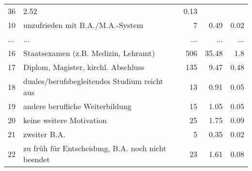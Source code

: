 \begin{longtable}{lXrrr}
          \num{36} &
          \num[round-mode=places,round-precision=2]{2,52} &
          \num[round-mode=places,round-precision=2]{0,13} \\
        10 & \multicolumn{1}{X}{unzufrieden mit B.A./M.A.-System} & %
          \num{7} &
          \num[round-mode=places,round-precision=2]{0,49} &
          \num[round-mode=places,round-precision=2]{0,02} \\
       ... & ... & ... & ... & ... \\
        16 & \multicolumn{1}{X}{Staatsexamen (z.B. Medizin, Lehramt)} & %
          \num{506} &
          \num[round-mode=places,round-precision=2]{35,48} &
          \num[round-mode=places,round-precision=2]{1,8} \\

        17 & \multicolumn{1}{X}{Diplom, Magister, kirchl. Abschluss} & %
          \num{135} &
          \num[round-mode=places,round-precision=2]{9,47} &
          \num[round-mode=places,round-precision=2]{0,48} \\

        18 & \multicolumn{1}{X}{duales/berufsbegleitendes Studium reicht aus} & %
          \num{13} &
          \num[round-mode=places,round-precision=2]{0,91} &
          \num[round-mode=places,round-precision=2]{0,05} \\

        19 & \multicolumn{1}{X}{andere berufliche Weiterbildung} & %
          \num{15} &
          \num[round-mode=places,round-precision=2]{1,05} &
          \num[round-mode=places,round-precision=2]{0,05} \\

        20 & \multicolumn{1}{X}{keine weitere Motivation} & %
          \num{25} &
          \num[round-mode=places,round-precision=2]{1,75} &
          \num[round-mode=places,round-precision=2]{0,09} \\

        21 & \multicolumn{1}{X}{zweiter B.A.} & %
          \num{5} &
          \num[round-mode=places,round-precision=2]{0,35} &
          \num[round-mode=places,round-precision=2]{0,02} \\

        22 & \multicolumn{1}{X}{zu früh für Entscheidung, B.A. noch nicht beendet} & %
          \num{23} &
          \num[round-mode=places,round-precision=2]{1,61} &
          \num[round-mode=places,round-precision=2]{0,08} \\


\end{longtable}
